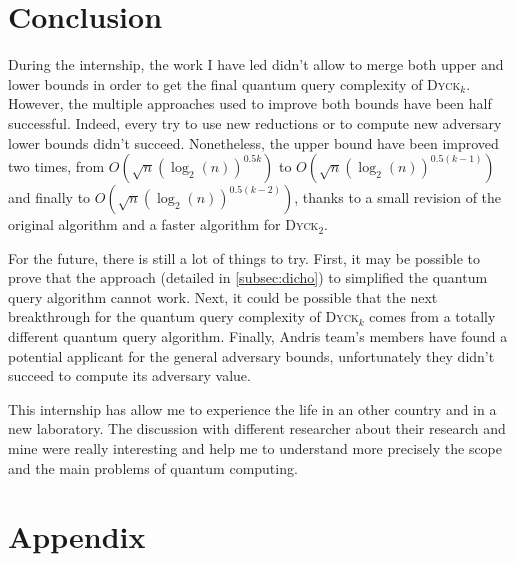 \documentclass[11pt,a4paper]{article}
\newcommand{\Dyck}[1]{\textsc{Dyck$_{#1}$}}
\theoremstyle{definition}
\theoremstyle{plain}
\theoremstyle{definition}
\begin{document}
\section{Conclusion}

During the internship, the work I have led didn't allow to merge
both  upper and lower bounds in order to get the final quantum
query complexity of \Dyck{k}. However, the multiple approaches used
to improve both bounds have been half successful. Indeed, every
try to use new reductions or to compute new adversary lower bounds
didn't succeed. Nonetheless, the upper bound have been improved
two times, from $O(\sqrt{n}(\log_2(n))^{0.5k})$ to
$O(\sqrt{n}(\log_2(n))^{0.5(k-1)})$ and finally to
$O(\sqrt{n}(\log_2(n))^{0.5(k-2)})$, thanks to a small revision
of the original algorithm and a faster algorithm for \Dyck{2}.

For the future, there is still a lot of things to try. First,
it may be possible to prove that the approach (detailed in
\autoref{subsec:dicho}) to simplified
the quantum query algorithm cannot work. Next, it could be possible
that the next breakthrough for the quantum query complexity of \Dyck{k}
comes from a totally different quantum query algorithm. Finally,
Andris team's members have found a potential applicant for the
general adversary bounds, unfortunately they didn't succeed to
compute its adversary value.

This internship has allow me to experience the life in an other
country and in a new laboratory. The discussion with different
researcher about their research and mine were really interesting
and help me to understand more precisely the scope and the main
problems of quantum computing.






\listoffigures
\listofalgorithms

\newpage

\section{Appendix}


\end{document}
